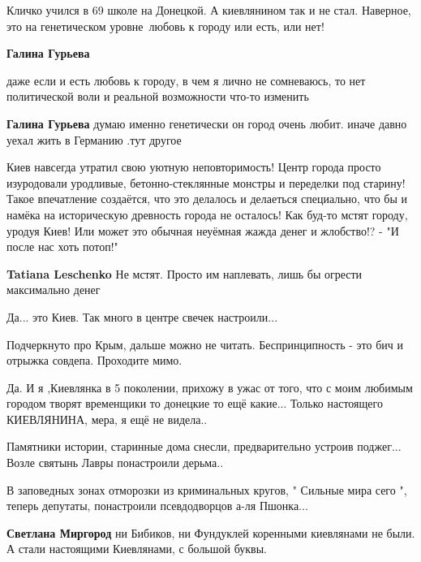 \begin{itemize}
\begin{itemize}

Кличко учился в 69 школе на Донецкой. А киевлянином так и не стал. Наверное, это
на генетическом уровне~любовь к городу или есть, или нет!

\begin{itemize} %
\textbf{Галина Гурьева} 

даже если и есть любовь к городу, в чем я лично не сомневаюсь, то нет
политической воли и реальной возможности что-то изменить

\textbf{Галина Гурьева} думаю именно генетически он город очень любит. иначе давно уехал жить в Германию .тут другое
\end{itemize} %

\end{itemize} %


Киев навсегда утратил свою уютную неповторимость! Центр города просто
изуродовали уродливые, бетонно-стеклянные монстры и переделки под старину!
Такое впечатление создаётся, что это делалось и делаеться специально, что бы и
намёка на историческую древность города не осталось! Как буд-то мстят городу,
уродуя Киев! Или может это обычная неуёмная жажда денег и жлобство!? - "И после
нас хоть потоп!"

\begin{itemize} %
\textbf{Tatiana Leschenko} Не мстят. Просто им наплевать, лишь бы огрести максимально денег
\end{itemize} %

Да... это Киев. Так много в центре свечек настроили...

Подчеркнуто про Крым, дальше можно не читать. Беспринципность - это бич и отрыжка совдепа. Проходите мимо.


Да. И я ,Киевлянка в 5 поколении, прихожу в ужас от того, что с моим любимым
городом творят временщики то донецкие то ещё какие... Только настоящего
КИЕВЛЯНИНА, мера, я ещё не видела..

Памятники истории, старинные дома снесли, предварительно устроив поджег...
Возле святынь Лавры понастроили дерьма..

В заповедных зонах отморозки из криминальных кругов, " Сильные мира сего ",
теперь депутаты, понастроили псевдодворцов а-ля Пшонка...

\begin{itemize} %
\textbf{Светлана Миргород} ни Бибиков, ни Фундуклей коренными киевлянами не были. А стали настоящими Киевлянами, с большой буквы.
\end{itemize} %


\end{itemize}
